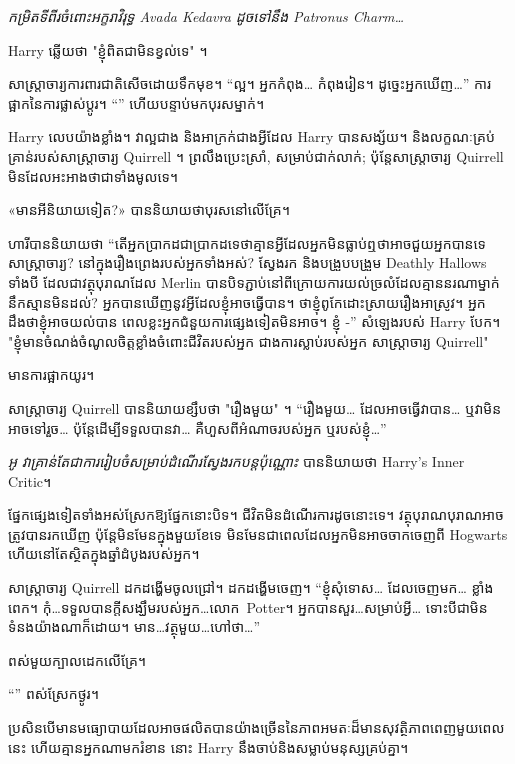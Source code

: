 {\emph{កម្រិតទីពីរចំពោះអក្ខរាវិរុទ្ធ Avada Kedavra ដូចទៅនឹង Patronus Charm…}

Harry ឆ្លើយថា "ខ្ញុំពិតជាមិនខ្វល់ទេ" ។

សាស្ត្រាចារ្យ​ការពារ​ជាតិ​សើច​ដោយ​ទឹក​មុខ។ “ល្អ។ អ្នកកំពុង… កំពុងរៀន។ ដូច្នេះអ្នកឃើញ…” ការផ្អាកនៃការផ្លាស់ប្តូរ។ “” ហើយបន្ទាប់មកបុរសម្នាក់។

Harry លេប​យ៉ាង​ខ្លាំង។ វាល្អជាង និងអាក្រក់ជាងអ្វីដែល Harry បានសង្ស័យ។ និងលក្ខណៈគ្រប់គ្រាន់របស់សាស្រ្តាចារ្យ Quirrell ។ ព្រលឹងប្រេះស្រាំ, សម្រាប់ជាក់លាក់; ប៉ុន្តែសាស្រ្តាចារ្យ Quirrell មិនដែលអះអាងថាជាទាំងមូលទេ។

«មានអីនិយាយទៀត?» បាននិយាយថាបុរសនៅលើគ្រែ។

ហារី​បាន​និយាយ​ថា “តើ​អ្នក​ប្រាកដ​ជា​ប្រាកដ​ទេ​ថា​គ្មាន​អ្វី​ដែល​អ្នក​មិន​ធ្លាប់​ឮ​ថា​អាច​ជួយ​អ្នក​បាន​ទេ​សាស្ត្រាចារ្យ​? នៅក្នុងរឿងព្រេងរបស់អ្នកទាំងអស់? ស្វែងរក និងបង្រួបបង្រួម Deathly Hallows ទាំងបី ដែលជាវត្ថុបុរាណដែល Merlin បានបិទភ្ជាប់នៅពីក្រោយការយល់ច្រលំដែលគ្មាននរណាម្នាក់នឹកស្មានមិនដល់? អ្នកបានឃើញនូវអ្វីដែលខ្ញុំអាចធ្វើបាន។ ថាខ្ញុំពូកែដោះស្រាយរឿងអាស្រូវ។ អ្នកដឹងថាខ្ញុំអាចយល់បាន ពេលខ្លះអ្នកជំនួយការផ្សេងទៀតមិនអាច។ ខ្ញុំ -” សំឡេងរបស់ Harry បែក។ "ខ្ញុំមានចំណង់ចំណូលចិត្តខ្លាំងចំពោះជីវិតរបស់អ្នក ជាងការស្លាប់របស់អ្នក សាស្រ្តាចារ្យ Quirrell"

មានការផ្អាកយូរ។

សាស្រ្តាចារ្យ Quirrell បាននិយាយខ្សឹបថា "រឿងមួយ" ។ “រឿងមួយ… ដែលអាចធ្វើវាបាន… ឬវាមិនអាចទៅរួច… ប៉ុន្តែដើម្បីទទួលបានវា… គឺហួសពីអំណាចរបស់អ្នក ឬរបស់ខ្ញុំ…”

\emph{អូ វាគ្រាន់តែជាការរៀបចំសម្រាប់ដំណើរស្វែងរកបន្តប៉ុណ្ណោះ} បាននិយាយថា Harry's Inner Critic។

ផ្នែកផ្សេងទៀតទាំងអស់ស្រែកឱ្យផ្នែកនោះបិទ។ ជីវិតមិនដំណើរការដូចនោះទេ។ វត្ថុបុរាណបុរាណអាចត្រូវបានរកឃើញ ប៉ុន្តែមិនមែនក្នុងមួយខែទេ មិនមែនជាពេលដែលអ្នកមិនអាចចាកចេញពី Hogwarts ហើយនៅតែស្ថិតក្នុងឆ្នាំដំបូងរបស់អ្នក។

សាស្ត្រាចារ្យ Quirrell ដកដង្ហើមចូលជ្រៅ។ ដកដង្ហើមចេញ។ “ខ្ញុំសុំទោស… ដែលចេញមក… ខ្លាំងពេក។ កុំ…ទទួលបានក្តីសង្ឃឹមរបស់អ្នក…លោក~Potter។ អ្នក​បាន​សួរ…សម្រាប់​អ្វី… ទោះ​បី​ជា​មិន​ទំនង​យ៉ាង​ណា​ក៏​ដោយ។ មាន…វត្ថុមួយ…ហៅថា…”

ពស់មួយក្បាលដេកលើគ្រែ។

“” ពស់ស្រែកថ្ងូរ។

ប្រសិនបើ​មាន​មធ្យោបាយ​ដែល​អាច​ផលិត​បាន​យ៉ាង​ច្រើន​នៃ​ភាព​អមតៈ​ដ៏​មាន​សុវត្ថិភាព​ពេញ​មួយ​ពេល​នេះ ហើយ​គ្មាន​អ្នក​ណា​មក​រំខាន នោះ Harry នឹង​ចាប់​និង​សម្លាប់​មនុស្ស​គ្រប់​គ្នា​។

}

